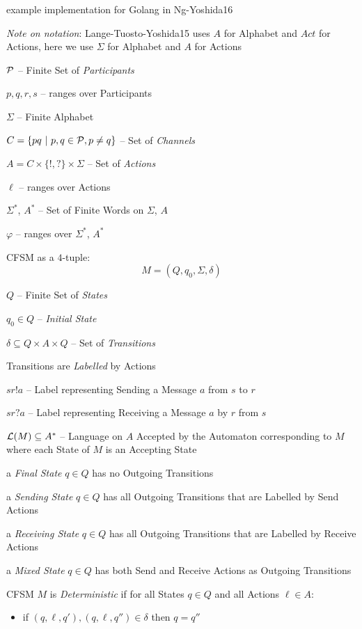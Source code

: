 example implementation for Golang in Ng-Yoshida16

\fist \emph{Note on notation}: Lange-Tuosto-Yoshida15 uses $A$ for
Alphabet and $Act$ for Actions, here we use $\Sigma$ for Alphabet and
$A$ for Actions

$\mathcal{P}$ -- Finite Set of \emph{Participants}

$p, q, r, s$ -- ranges over Participants

$\Sigma$ -- Finite Alphabet

$C = \{ pq \ |\ p,q \in \mathcal{P}, p \neq q \}$ -- Set of
\emph{Channels}

$A = C \times \{!,?\} \times \Sigma$ -- Set of \emph{Actions}

$\ell$ -- ranges over Actions

$\Sigma^*$, $A^*$ -- Set of Finite Words on $\Sigma$, $A$

$\varphi$ -- ranges over $\Sigma^*$, $A^*$

CFSM as a $4$-tuple:
\[
  M = (Q, q_0, \Sigma, \delta)
\]

$Q$ -- Finite Set of \emph{States}

$q_0 \in Q$ -- \emph{Initial State}

$\delta \subseteq Q \times A \times Q$ -- Set of \emph{Transitions}

Transitions are \emph{Labelled} by Actions

$sr!a$ -- Label representing Sending a Message $a$ from $s$ to $r$

$sr?a$ -- Label representing Receiving a Message $a$ by $r$ from $s$

$\mathcal{L}(M) \subseteq A^*$ -- Language on $A$ Accepted by the
Automaton corresponding to $M$ where each State of $M$ is an Accepting
State %

a \emph{Final State} $q \in Q$ has no Outgoing Transitions

a \emph{Sending State} $q \in Q$ has all Outgoing Transitions that are
Labelled by Send Actions

a \emph{Receiving State} $q \in Q$ has all Outgoing Transitions that are
Labelled by Receive Actions

a \emph{Mixed State} $q \in Q$ has both Send and Receive Actions as
Outgoing Transitions

CFSM $M$ is \emph{Deterministic} if for all States $q \in Q$ and all
Actions $\ell \in A$:
\begin{itemize}
  \item if $(q,\ell,q'),(q,\ell,q'') \in \delta$ then $q = q''$
\end{itemize}

